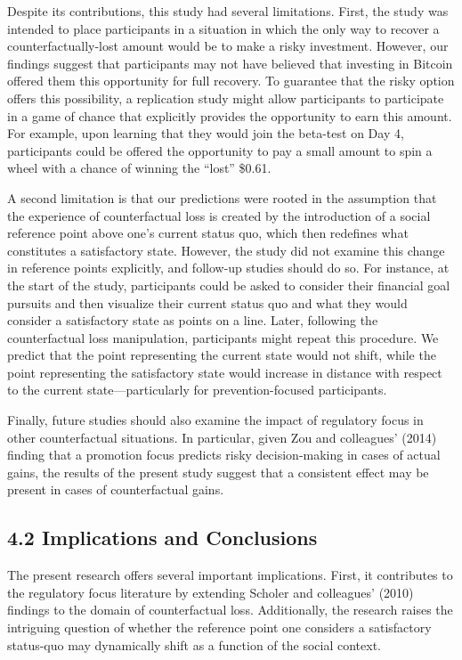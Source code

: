 \documentclass[man,floatsintext]{apa6}
\begin{document}
Despite its contributions, this study had several limitations. First, the study was intended to place participants in a situation in which the only way to recover a counterfactually-lost amount would be to make a risky investment. However, our findings suggest that participants may not have believed that investing in Bitcoin offered them this opportunity for full recovery. To guarantee that the risky option offers this possibility, a replication study might allow participants to participate in a game of chance that explicitly provides the opportunity to earn this amount. For example, upon learning that they would join the beta-test on Day 4, participants could be offered the opportunity to pay a small amount to spin a wheel with a chance of winning the \enquote{lost} \$0.61.

A second limitation is that our predictions were rooted in the assumption that the experience of counterfactual loss is created by the introduction of a social reference point above one's current status quo, which then redefines what constitutes a satisfactory state. However, the study did not examine this change in reference points explicitly, and follow-up studies should do so. For instance, at the start of the study, participants could be asked to consider their financial goal pursuits and then visualize their current status quo and what they would consider a satisfactory state as points on a line. Later, following the counterfactual loss manipulation, participants might repeat this procedure. We predict that the point representing the current state would not shift, while the point representing the satisfactory state would increase in distance with respect to the current state---particularly for prevention-focused participants.

Finally, future studies should also examine the impact of regulatory focus in other counterfactual situations. In particular, given Zou and colleagues' (2014) finding that a promotion focus predicts risky decision-making in cases of actual gains, the results of the present study suggest that a consistent effect may be present in cases of counterfactual gains.

\hypertarget{implications-and-conclusions}{%
\subsection{4.2 Implications and Conclusions}\label{implications-and-conclusions}}

The present research offers several important implications. First, it contributes to the regulatory focus literature by extending Scholer and colleagues' (2010) findings to the domain of counterfactual loss. Additionally, the research raises the intriguing question of whether the reference point one considers a satisfactory status-quo may dynamically shift as a function of the social context.
\end{document}
